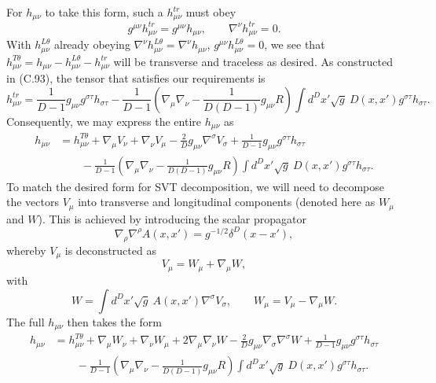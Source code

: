 \documentclass[10pt,letterpaper]{article}
\begin{document}
For $h_{\mu\nu}$ to take this form, such a $h_{\mu\nu}^{tr}$ must obey
\begin{equation}
g^{\mu\nu}h_{\mu\nu}^{tr} = g^{\mu\nu}h_{\mu\nu},\qquad \nabla^\nu h_{\mu\nu}^{tr} = 0.
\end{equation}
With $h^{L\theta}_{\mu\nu}$ already obeying $\nabla^\nu h_{\mu\nu}^{L\theta} = \nabla^\nu h_{\mu\nu}$, $g^{\mu\nu}h_{\mu\nu}^{L\theta} = 0$, 
we see that $h^{T\theta}_{\mu\nu} = h_{\mu\nu} - h^{L\theta}_{\mu\nu} - h^{tr}_{\mu\nu}$ will be transverse and traceless as desired. As constructed in (C.93),
the tensor that satisfies our requirements is
\begin{equation}
h_{\mu\nu}^{tr} = \frac{1}{D-1} g_{\mu\nu} g^{\sigma\tau}h_{\sigma\tau}  - \frac{1}{D-1}\left( \nabla_\mu\nabla_\nu - \frac{1}{D(D-1)}g_{\mu\nu}R\right)
 \int d^Dx' \sqrt{g}\ D(x,x') g^{\sigma\tau}h_{\sigma\tau}.
\end{equation}
Consequently, we may express the entire $h_{\mu\nu}$ as
\begin{align}
h_{\mu\nu} &= h^{T\theta}_{\mu\nu} + \nabla_\mu V_\nu +\nabla_\nu V_\mu -\frac{2}{D} g_{\mu\nu} \nabla^\sigma V_\sigma+
 \frac{1}{D-1} g_{\mu\nu} g^{\sigma\tau}h_{\sigma\tau}
\nonumber\\
&\qquad - \frac{1}{D-1}\left( \nabla_\mu\nabla_\nu - \frac{1}{D(D-1)}g_{\mu\nu}R\right)
 \int d^Dx' \sqrt{g}\ D(x,x') g^{\sigma\tau}h_{\sigma\tau}.
\end{align}
To match the desired form for SVT decomposition, we will need to decompose the vectors $V_{\mu}$ into transverse and longitudinal components (denoted here as $W_\mu$ and $W$). This is achieved by introducing the scalar propagator
\begin{equation}
 \nabla_\rho \nabla^\rho A(x,x') = g^{-1/2} \delta^D(x-x'),
\end{equation}
whereby $V_\mu$ is deconstructed as
\begin{equation}
V_{\mu} = W_{\mu} + \nabla_\mu W,
\end{equation}
with
\begin{equation}
W = \int d^Dx' \sqrt{g}\ A(x,x') \nabla^\sigma V_\sigma,\qquad W_{\mu} = V_{\mu} - \nabla_\mu W.
\end{equation}
The full $h_{\mu\nu}$ then takes the form
\begin{align}
h_{\mu\nu} &= h^{T\theta}_{\mu\nu} +\nabla_\mu W_\nu +\nabla_\nu W_\mu +2\nabla_\mu\nabla_\nu W - \frac{2}{D}g_{\mu\nu} \nabla_\sigma \nabla^\sigma W +
 \frac{1}{D-1} g_{\mu\nu} g^{\sigma\tau}h_{\sigma\tau}
\nonumber\\
&\qquad - \frac{1}{D-1}\left( \nabla_\mu\nabla_\nu - \frac{1}{D(D-1)}g_{\mu\nu}R\right)
 \int d^Dx' \sqrt{g}\ D(x,x') g^{\sigma\tau}h_{\sigma\tau}.
\end{align}
\end{document}
